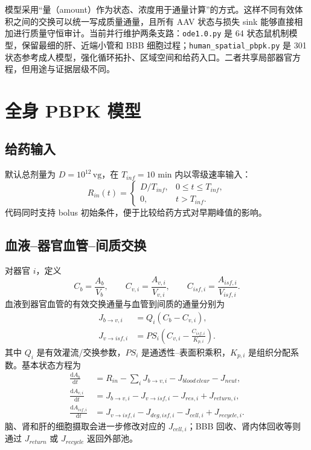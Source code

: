 \documentclass[UTF8,11pt,a4paper]{ctexart}
\newcommand{\vg}{\mathrm{vg}}
\newcommand{\dd}{\mathrm{d}}
\newcommand{\code}[1]{\texttt{#1}}
\begin{document}
模型采用“量（amount）作为状态、浓度用于通量计算”的方式。这样不同有效体积之间的交换可以统一写成质量通量，且所有 AAV 状态与损失 sink 能够直接相加进行质量守恒审计。当前并行维护两条支路：\code{ode1.0.py} 是 64 状态鼠机制模型，保留最细的肝、近端小管和 BBB 细胞过程；\code{human\_spatial\_pbpk.py} 是 301 状态参考成人模型，强化循环拓扑、区域空间和给药入口。二者共享局部器官方程，但用途与证据层级不同。

\section{全身 PBPK 模型}

\subsection{给药输入}
默认总剂量为 $D=10^{12}\,\vg$，在 $T_{inf}=10$ min 内以零级速率输入：
\begin{equation}
R_{in}(t)=
\begin{cases}
D/T_{inf}, & 0\le t\le T_{inf},\\
0, & t>T_{inf}.
\end{cases}
\end{equation}
代码同时支持 bolus 初始条件，便于比较给药方式对早期峰值的影响。

\subsection{血液--器官血管--间质交换}
对器官 $i$，定义
\begin{equation}
C_b=\frac{A_b}{V_b},\qquad C_{v,i}=\frac{A_{v,i}}{V_{v,i}},\qquad C_{isf,i}=\frac{A_{isf,i}}{V_{isf,i}}.
\end{equation}
血液到器官血管的有效交换通量与血管到间质的通量分别为
\begin{align}
J_{b\to v,i} &= Q_i(C_b-C_{v,i}),\\
J_{v\to isf,i} &= PS_i\left(C_{v,i}-\frac{C_{isf,i}}{K_{p,i}}\right).
\end{align}
其中 $Q_i$ 是有效灌流/交换参数，$PS_i$ 是通透性--表面积乘积，$K_{p,i}$ 是组织分配系数。基本状态方程为
\begin{align}
\frac{\dd A_b}{\dd t} &= R_{in}-\sum_iJ_{b\to v,i}-J_{blood\,clear}-J_{neut},\\
\frac{\dd A_{v,i}}{\dd t} &= J_{b\to v,i}-J_{v\to isf,i}-J_{res,i}+J_{return,i},\\
\frac{\dd A_{isf,i}}{\dd t} &= J_{v\to isf,i}-J_{deg,isf,i}-J_{cell,i}+J_{recycle,i}.
\end{align}
脑、肾和肝的细胞摄取会进一步修改对应的 $J_{cell,i}$；BBB 回收、肾内体回收等则通过 $J_{return}$ 或 $J_{recycle}$ 返回外部池。
\end{document}
